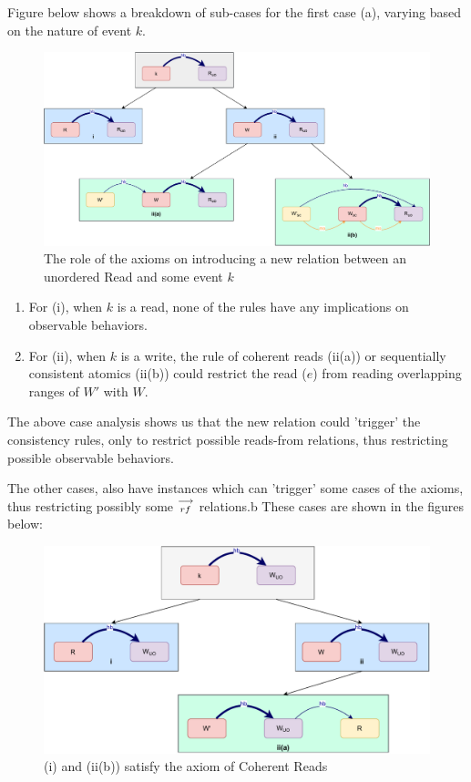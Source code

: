         Figure below shows a breakdown of sub-cases for the first case (a), varying based
        on the nature of event $k$.
        \begin{figure}[H]
            \centering
            \includegraphics[scale=0.6]{Q3_(b)Case1.pdf}
            \caption{The role of the axioms on introducing a new relation between an unordered Read and some event $k$}
            \label{fig:my_label}
        \end{figure}
        
        \begin{enumerate}
            \item For (i), when $k$ is a read, none of the rules have any implications on observable behaviors.
            \item For (ii), when $k$ is a write, the rule of coherent reads (ii(a)) or sequentially consistent atomics (ii(b)) could restrict the read ($e$) from reading overlapping ranges of $W'$ with $W$.
        \end{enumerate}
        
        The above case analysis shows us that the new relation could 'trigger' the consistency rules, only to restrict possible reads-from relations, thus restricting possible observable behaviors. 

        The other cases, also have instances which can 'trigger' some cases of the axioms, thus restricting possibly some $\stackrel{\longrightarrow}{_{rf}}$ relations.b These cases are shown in the figures below: 
        \begin{figure}[H]
            \centering
            \includegraphics[scale=0.6]{Q3_(c)Case2.pdf}
            \caption{(i) and (ii(b)) satisfy the axiom of Coherent Reads}
            \label{fig:my_label}
        \end{figure}
              
